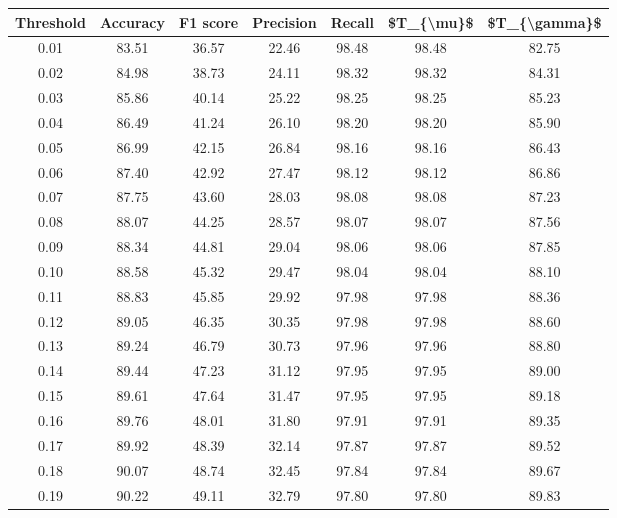 \begin{tabular}{|c|c|c|c|c|c|c|}
\hline
 Threshold &  Accuracy &  F1 score &  Precision &  Recall &  \$T\_\{\textbackslash mu\}\$ &  \$T\_\{\textbackslash gamma\}\$ \\
\hline
      0.01 &     83.51 &     36.57 &      22.46 &   98.48 &      98.48 &         82.75 \\
      0.02 &     84.98 &     38.73 &      24.11 &   98.32 &      98.32 &         84.31 \\
      0.03 &     85.86 &     40.14 &      25.22 &   98.25 &      98.25 &         85.23 \\
      0.04 &     86.49 &     41.24 &      26.10 &   98.20 &      98.20 &         85.90 \\
      0.05 &     86.99 &     42.15 &      26.84 &   98.16 &      98.16 &         86.43 \\
      0.06 &     87.40 &     42.92 &      27.47 &   98.12 &      98.12 &         86.86 \\
      0.07 &     87.75 &     43.60 &      28.03 &   98.08 &      98.08 &         87.23 \\
      0.08 &     88.07 &     44.25 &      28.57 &   98.07 &      98.07 &         87.56 \\
      0.09 &     88.34 &     44.81 &      29.04 &   98.06 &      98.06 &         87.85 \\
      0.10 &     88.58 &     45.32 &      29.47 &   98.04 &      98.04 &         88.10 \\
      0.11 &     88.83 &     45.85 &      29.92 &   97.98 &      97.98 &         88.36 \\
      0.12 &     89.05 &     46.35 &      30.35 &   97.98 &      97.98 &         88.60 \\
      0.13 &     89.24 &     46.79 &      30.73 &   97.96 &      97.96 &         88.80 \\
      0.14 &     89.44 &     47.23 &      31.12 &   97.95 &      97.95 &         89.00 \\
      0.15 &     89.61 &     47.64 &      31.47 &   97.95 &      97.95 &         89.18 \\
      0.16 &     89.76 &     48.01 &      31.80 &   97.91 &      97.91 &         89.35 \\
      0.17 &     89.92 &     48.39 &      32.14 &   97.87 &      97.87 &         89.52 \\
      0.18 &     90.07 &     48.74 &      32.45 &   97.84 &      97.84 &         89.67 \\
      0.19 &     90.22 &     49.11 &      32.79 &   97.80 &      97.80 &         89.83 \\

\end{tabular}
